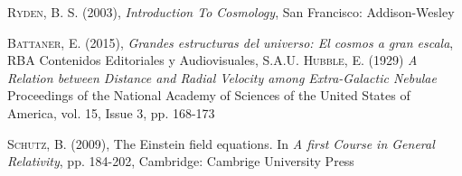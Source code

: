 \documentclass[a4paper,openright,12pt]{book}
\begin{document}
\cleardoublepage
{}
\begin{thebibliography}{a}

 \textsc{Ryden, B. S. (2003)},
\textit{Introduction To Cosmology},
San Francisco: Addison-Wesley

 \textsc{Battaner, E. (2015)},
\textit{Grandes estructuras del universo: El cosmos a gran escala},
RBA Contenidos Editoriales y Audiovisuales, S.A.U.
 \textsc{Hubble, E. (1929)}
\textit{A Relation between Distance and Radial Velocity among Extra-Galactic Nebulae}
Proceedings of the National Academy of Sciences of the United States of America, 
vol. 15, Issue 3, pp. 168-173

 \textsc{Schutz, B. (2009)},
The Einstein field equations. In
\textit{A first Course in General Relativity},
pp. 184-202, Cambridge: Cambrige University Press


\end{thebibliography}
\end{document}

